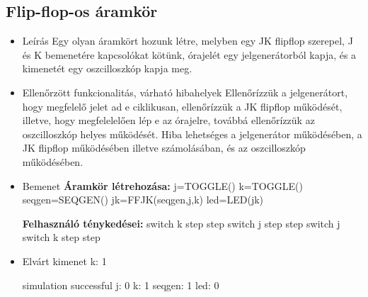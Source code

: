 \subsection{Flip-flop-os áramkör}
\begin{itemize}
\item Leírás\newline
Egy olyan áramkört hozunk létre, melyben egy JK flipflop szerepel, J és K bemenetére kapcsolókat kötünk, órajelét egy jelgenerátorból kapja, és a kimenetét egy oszcilloszkóp kapja meg.
\item Ellenőrzött funkcionalitás, várható hibahelyek\newline
Ellenőrízzük a jelgenerátort, hogy megfelelő jelet ad e ciklikusan, ellenőrízzük a JK flipflop működését, illetve, hogy megfelelelően lép e az órajelre, továbbá ellenőrízzük az oszcilloszkóp helyes működését. Hiba lehetséges a jelgenerátor működésében, a JK flipflop működésében illetve számolásában, és az oszcilloszkóp működésében.
\item Bemenet\newline
\newline
{\bf Áramkör létrehozása:}\newline
j=TOGGLE()\newline
k=TOGGLE()\newline
seqgen=SEQGEN()\newline
jk=FFJK(seqgen,j,k)\newline
led=LED(jk)\newline

{\bf Felhasználó ténykedései:}\newline
switch k\newline
step\newline
step\newline
switch j\newline
step\newline
step\newline
switch j\newline
switch k\newline
step\newline
step\newline

\item Elvárt kimenet\newline
k: 1\newline

simulation successful\newline
j: 0\newline
k: 1\newline
seqgen: 1\newline
led: 0\newline


\end{itemize}
